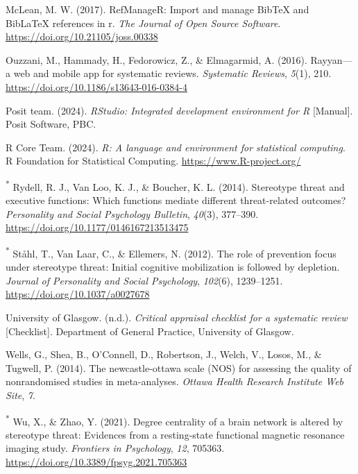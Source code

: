 \documentclass[
  stu,floatsintext]{apa7}
\newlength{\cslhangindent}
\newenvironment{CSLReferences}[2] %
 {\begin{list}{}{%
  \setlength{\itemindent}{0pt}
  \setlength{\leftmargin}{0pt}
  \setlength{\parsep}{0pt}
  \ifodd #1
   \setlength{\leftmargin}{\cslhangindent}
   \setlength{\itemindent}{-1\cslhangindent}
  \fi
  \setlength{\itemsep}{#2\baselineskip}}}
 {\end{list}}
\begin{document}
\begin{CSLReferences}{1}{0}
McLean, M. W. (2017). RefManageR: Import and manage BibTeX and BibLaTeX references in r. \emph{The Journal of Open Source Software}. \url{https://doi.org/10.21105/joss.00338}

Ouzzani, M., Hammady, H., Fedorowicz, Z., \& Elmagarmid, A. (2016). Rayyan---a web and mobile app for systematic reviews. \emph{Systematic Reviews}, \emph{5}(1), 210. \url{https://doi.org/10.1186/s13643-016-0384-4}

Posit team. (2024). \emph{{RStudio}: {Integrated} development environment for {R}} {[}Manual{]}. Posit Software, PBC.

R Core Team. (2024). \emph{R: A language and environment for statistical computing}. R Foundation for Statistical Computing. \url{https://www.R-project.org/}

\textsuperscript{*} Rydell, R. J., Van Loo, K. J., \& Boucher, K. L. (2014). Stereotype threat and executive functions: {Which} functions mediate different threat-related outcomes? \emph{Personality and Social Psychology Bulletin}, \emph{40}(3), 377--390. \url{https://doi.org/10.1177/0146167213513475}

\textsuperscript{*} Ståhl, T., Van Laar, C., \& Ellemers, N. (2012). The role of prevention focus under stereotype threat: {Initial} cognitive mobilization is followed by depletion. \emph{Journal of Personality and Social Psychology}, \emph{102}(6), 1239--1251. \url{https://doi.org/10.1037/a0027678}

University of Glasgow. (n.d.). \emph{Critical appraisal checklist for a systematic review} {[}Checklist{]}. Department of General Practice, University of Glasgow.

Wells, G., Shea, B., O'Connell, D., Robertson, J., Welch, V., Losos, M., \& Tugwell, P. (2014). The newcastle-ottawa scale ({NOS}) for assessing the quality of nonrandomised studies in meta-analyses. \emph{Ottawa Health Research Institute Web Site}, \emph{7}.

\textsuperscript{*} Wu, X., \& Zhao, Y. (2021). Degree centrality of a brain network is altered by stereotype threat: {Evidences} from a resting-state functional magnetic resonance imaging study. \emph{Frontiers in Psychology}, \emph{12}, 705363. \url{https://doi.org/10.3389/fpsyg.2021.705363}


\end{CSLReferences}
\end{document}
